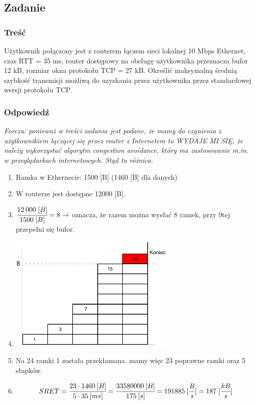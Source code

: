 	\subsection{Zadanie}
		\subsubsection{Treść}
			Użytkownik połączony jest z routerem łączem sieci lokalnej 10 Mbps Ethernet, czas RTT = 35 ms, router dostępowy na obsługę użytkownika przeznacza bufor 12 kB, rozmiar okna protokołu TCP = 27 kB. Określić maksymalną średnią szybkość transmisji możliwą do uzyskania przez użytkownika przez standardowej wersji protokołu TCP.
		\subsubsection{Odpowiedź}
			{\small \emph{Forczu: ponieważ w treści zadania jest podane, że mamy do czynienia z użytkownikiem łączącej się przez router z Internetem to WYDAJE MI SIĘ, że należy wykorzystać algorytm \emph{congestion avoidance}, który ma zastosowanie m.in. w przeglądarkach internetowych. Stąd ta różnica.}}\\
			\begin{enumerate}
				\item Ramka w Ethernecie: 1500 [B] (1460 [B] dla danych)
				\item W routerze jest dostępne 12000 [B].
				\item $ \cfrac{12\:000\;[B]}{1500\;[B]}=8 \rightarrow $ oznacza, że razem można wysłać 8 ramek, przy 9tej przepełni się bufor.
				\item \includegraphics[width=8.0cm]{./images/zadanie15.pdf}
				\item Na 24 ramki 1 została przekłamana. mamy więc 23 poprawne ramki oraz 5 słupków.
				\item $$ SRET=\cfrac{23\cdot1460\:[B]}{5\cdot35\:[ms]}=\cfrac{33580000\:[B]}{175\:[s]}=191885\:[\cfrac{B}{s}]=187\;[\cfrac{kB}{s}] $$
			\end{enumerate}
			
